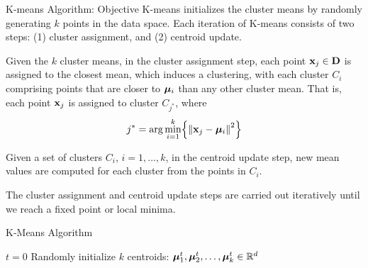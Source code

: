 \begin{frame}{K-means Algorithm: Objective}
K-means initializes the cluster means by randomly generating $k$
points in the data space. 
Each iteration of K-means consists of two steps: (1) cluster
assignment, and (2) centroid update. 

\medskip
Given the $k$ cluster means,
in the cluster assignment step, each point $\mathbf{x}_{j} \in \mathbf{D}$ is
assigned to the closest mean, which induces a clustering, with
each cluster $C_i$ comprising points that are closer to ${\bm \mu}_i$
than any other cluster mean. That is, each point $\mathbf{x}_{j}$ is
assigned to cluster $C_{j^*}$, where
\begin{align*}
j^* = \arg \min_{i=1}^k \Bigl\{\left\lVert\mathbf{x}_{j} - {\bm \mu}_i\right\rVert^2\Bigr\}
\end{align*}

\medskip
Given a set of clusters $C_i$, $i=1,\dots,k$, in the centroid
update step, new mean values are computed for each
cluster from the points in $C_i$.

\medskip
The cluster assignment and centroid update
steps are
carried out iteratively until we reach a f\/{i}xed point or local
minima. 
\end{frame}


\begin{frame}[fragile]{K-Means Algorithm}
\begin{algorithm}[H]
\Algorithm{}
$t = 0$\;
Randomly initialize $k$ centroids: ${\bm \mu}_1^t, {\bm \mu}_2^t, \dots,
{\bm \mu}_k^t \in {\mathord{\mathbb R}}^d$\;
\end{algorithm}
\end{frame}


